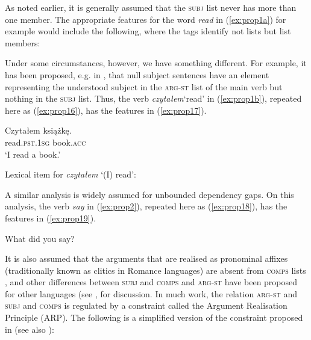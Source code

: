 \documentclass[output=paper
	        ,collection
	        ,collectionchapter
 	        ,biblatex
                ,babelshorthands
                ,newtxmath
                ,draftmode
                ,colorlinks, citecolor=brown
]{langscibook}
\begin{document}
\ea\label{ex:prop14}
\z

As noted earlier, it is generally assumed that the \textsc{subj} list never has more than one member. The appropriate features for the word \emph{read} in (\ref{ex:prop1a}) for example would include the following, where the tags identify not lists but list members:

\ea\label{ex:prop15}
\z

Under some circumstances, however, we have something different. For example, it has been proposed, e.g. in \citet[65]{MS99a}, that null subject sentences have an element representing the understood subject in the \textsc{arg-st} list of the main verb but nothing in the \textsc{subj} list. Thus, the verb \emph{czytałem}`read' in (\ref{ex:prop1b}), repeated here as (\ref{ex:prop16}), has the features in (\ref{ex:prop17}).

\eal\label{ex:prop16}
\ex
\gll Czytałem książkę.\\
read.\textsc{pst.1sg} book.\textsc{acc}\\
\glt `I read a book.'

\ex\label{ex:prop17}
Lexical item for \emph{czytałem} `(I) read':\\
\zl

A similar analysis is widely assumed for unbounded dependency gaps. On this analysis, the verb \emph{say} in (\ref{ex:prop2}), repeated here as (\ref{ex:prop18}), has the features in (\ref{ex:prop19}).

\ea\label{ex:prop18}
What did you say?

\ex\label{ex:prop19}
\z

It is also assumed that the arguments that are realised as pronominal affixes (traditionally known as clitics in Romance languages) are absent from \textsc{comps} lists \citep{MS97a-u,monachesi05}, and other differences between \textsc{subj} and \textsc{comps} and \textsc{arg-st} have been proposed for other languages (see \citealt{MS99a},  for discussion. In much work, the relation \textsc{arg-st} and \textsc{subj} and \textsc{comps} is regulated by a constraint called the Argument Realisation Principle (ARP). The following is a simplified version of the constraint proposed in \citet[171]{GSag2000a-u} (see also \citealt[12]{BMS2001a}):
\end{document}
